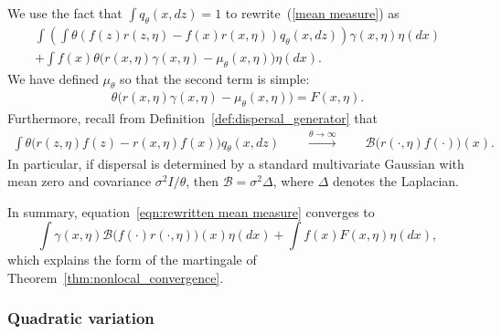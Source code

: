 \documentclass[12pt]{article}
\newcommand{\DG}{\mathcal{B}}  %
\numberwithin{equation}{section}
\begin{document}
We use the fact that $\int q_\theta(x,dz)=1$ to rewrite~(\ref{mean measure})
as 
\begin{equation}
\label{eqn:rewritten mean measure}
\begin{split}
    \int\left(
        \int \theta \left( f(z) r(z,\eta)- f(x) r(x,\eta) \right) q_\theta(x,dz)
    \right)
    \gamma(x,\eta)
    \eta(dx)
    \\
    + \int f(x) \theta \Big(
        r(x,\eta) \gamma(x,\eta)
        - \mu_\theta(x,\eta)
    \Big) \eta(dx).
\end{split}
\end{equation}
We have defined $\mu_\theta$ so that the second term is simple:
\begin{align*}
    \theta \Big( r(x,\eta) \gamma(x,\eta) - \mu_\theta(x,\eta) \Big)
    = F(x, \eta) .
\end{align*}
Furthermore, recall from Definition~\ref{def:dispersal_generator} that
\begin{align} \label{eqn:near_critical}
    \int \theta \Big(
        r(z,\eta) f(z)
        -
        r(x,\eta) f(x)
    \Big) q_\theta(x,dz) 
    \qquad \stackrel{\theta\to\infty}{\longrightarrow} \qquad  
    \DG \big(r(\cdot,\eta)f(\cdot)\big)(x) .
\end{align}
In particular,
if dispersal is determined by a standard multivariate Gaussian
with mean zero and covariance $\sigma^2 I / \theta$,
then $\DG = \sigma^2 \Delta$, where $\Delta$ denotes the Laplacian.

In summary, equation~\eqref{eqn:rewritten mean measure} converges to
\begin{equation} \label{limit of mean measure equation}
\int \gamma(x,\eta)
\DG \big(f(\cdot)r(\cdot,\eta)\big)(x)
\eta(dx)
+
\int f(x)
F(x,\eta)
\eta(dx) ,
\end{equation}
which explains the form of the martingale of Theorem~\ref{thm:nonlocal_convergence}.


\subsubsection*{Quadratic variation}

\end{document}
